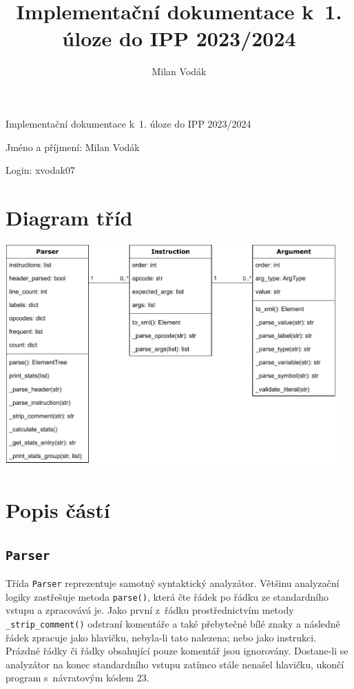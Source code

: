 \documentclass{article}[a4paper]
\title{Implementační dokumentace k~1. úloze do IPP 2023/2024}
\author{Milan Vodák}
\begin{document}
    \begin{center}
        {\Large Implementační dokumentace k~1. úloze do IPP 2023/2024}

        Jméno a příjmení: Milan Vodák

        Login: xvodak07
    \end{center}

    \section{Diagram tříd}

    \begin{center}
        \includegraphics[width=0.95\textwidth]{class-diagram.pdf}
    \end{center}

    \section{Popis částí}

    \subsection{\texttt{Parser}}

    Třída \texttt{Parser} reprezentuje samotný syntaktický analyzátor.
    Většinu analyzační logiky zastřešuje metoda \texttt{parse()}, která čte řádek po řádku ze standardního vstupu a zpracovává je.
    Jako první z~řádku prostřednictvím metody \texttt{\_strip\_comment()} odstraní komentáře a také přebytečné bílé znaky a následně řádek zpracuje jako hlavičku, nebyla-li tato nalezena; nebo jako instrukci.
    Prázdné řádky či řádky obsahující pouze komentář jsou ignorovány.
    Dostane-li se analyzátor na konec standardního vstupu zatímco stále nenašel hlavičku, ukončí program s~návratovým kódem 23.
\end{document}

